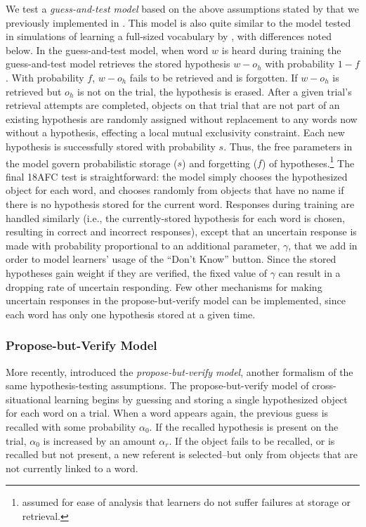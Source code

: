 \documentclass[man,floatsintext]{apa6}
\begin{document}
We test a {\em guess-and-test model} based on the above assumptions stated by \cite{Medina:2011} that we previously implemented in \cite{Kachergis:2012hyp}.
This model is also quite similar to the model tested in simulations of learning a full-sized vocabulary by \cite{Blythe:2010il}, with differences noted below. In the guess-and-test model, when word $w$ is heard during training the guess-and-test model retrieves the stored hypothesis $w-o_h$ with probability $1-f$. With probability $f$, $w-o_h$ fails to be retrieved and is forgotten. If $w-o_h$ is retrieved but $o_h$ is not on the trial, the hypothesis is erased. After a given trial's retrieval attempts are completed, objects on that trial that are not part of an existing hypothesis are randomly assigned without replacement to any words now without a hypothesis, effecting a local mutual exclusivity constraint. Each new hypothesis is successfully stored with probability $s$. Thus, the free parameters in the model govern probabilistic storage ($s$) and forgetting ($f$) of hypotheses.\footnote{\cite{Blythe:2010il} assumed for ease of analysis that learners do not suffer failures at storage or retrieval.} 
The final 18AFC test is straightforward: the model simply chooses the hypothesized object for each word, and chooses randomly from objects that have no name if there is no hypothesis stored for the current word. Responses during training are handled similarly (i.e., the currently-stored hypothesis for each word is chosen, resulting in correct and incorrect responses), except that an uncertain response is made with probability proportional to an additional parameter, $\gamma$, that we add in order to model learners' usage of the ``Don't Know'' button. Since the stored hypotheses gain weight if they are verified, the fixed value of $\gamma$ can result in a dropping rate of uncertain responding. Few other mechanisms for making uncertain responses in the propose-but-verify model can be implemented, since each word has only one hypothesis stored at a given time.

\subsubsection{Propose-but-Verify Model}

More recently, \cite{Trueswell:2013} introduced the {\em propose-but-verify model}, another formalism of the same hypothesis-testing assumptions. The propose-but-verify model of cross-situational learning begins by guessing and storing a single hypothesized object for each word on a trial. When a word appears again, the previous guess is recalled with some probability $\alpha_0$. If the recalled hypothesis is present on the trial, $\alpha_0$ is increased by an amount $\alpha_r$. If the object fails to be recalled, or is recalled but not present, a new referent is selected--but only from objects that are not currently linked to a word.
\end{document}
